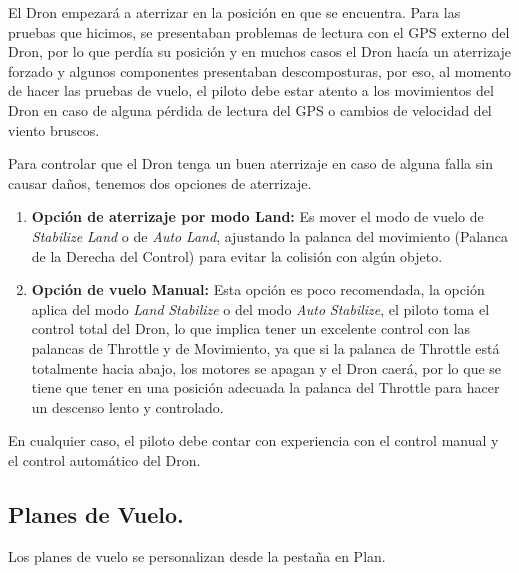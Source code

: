 El Dron empezará a aterrizar en la posición en que se encuentra.
Para las pruebas que hicimos, se presentaban problemas de lectura con el GPS externo del Dron, por lo que perdía su posición y en muchos casos el Dron hacía un aterrizaje forzado y algunos componentes presentaban descomposturas, por eso, al momento de hacer las pruebas de vuelo, el piloto debe estar atento a los movimientos del Dron en caso de alguna pérdida de lectura del GPS o cambios de velocidad del viento bruscos.

Para controlar que el Dron tenga un buen aterrizaje en caso de alguna falla sin causar daños, tenemos dos opciones de aterrizaje.

\begin{enumerate}
	\item \textbf{Opción de aterrizaje por modo Land:} Es mover el modo de vuelo de \textit{Stabilize} \textrightarrow \textit{Land} o de \textit{Auto} \textrightarrow \textit{Land}, ajustando la palanca del movimiento (Palanca de la Derecha del Control) para evitar la colisión con algún objeto.
	\item  \textbf{Opción de vuelo Manual:} Esta opción es poco recomendada, la opción aplica del modo \textit{Land} \textrightarrow \textit{Stabilize} o del modo \textit{Auto} \textrightarrow \textit{Stabilize}, el piloto toma el control total del Dron, lo que implica tener un excelente control con las palancas de Throttle y de Movimiento, ya que si la palanca de Throttle está totalmente hacia abajo, los motores se apagan y el Dron caerá, por lo que se tiene que tener en una posición adecuada la palanca del Throttle para hacer un descenso lento y controlado.
\end{enumerate}

En cualquier caso, el piloto debe contar con experiencia con el control manual y el control automático del Dron.

\subsection{Planes de Vuelo.}

Los planes de vuelo se personalizan desde la pestaña en Plan.

